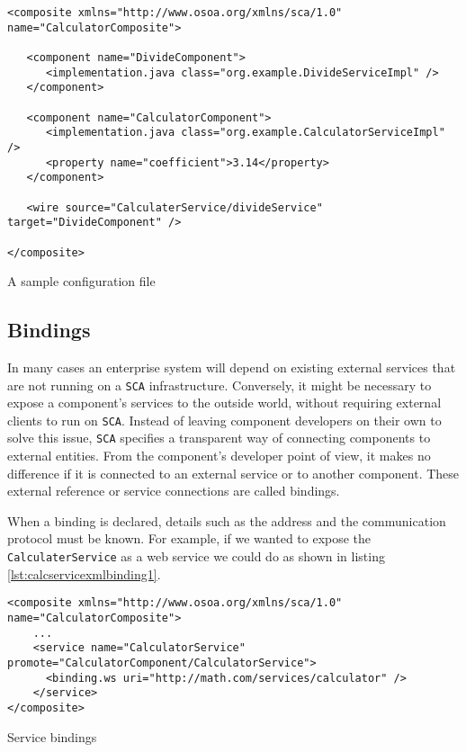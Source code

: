 \begin{listing}
\begin{verbatim}
<composite xmlns="http://www.osoa.org/xmlns/sca/1.0" name="CalculatorComposite">

   <component name="DivideComponent">
      <implementation.java class="org.example.DivideServiceImpl" />
   </component>

   <component name="CalculatorComponent">
      <implementation.java class="org.example.CalculatorServiceImpl" />
      <property name="coefficient">3.14</property>
   </component>
   
   <wire source="CalculaterService/divideService" target="DivideComponent" />

</composite>
\end{verbatim}
\caption{A sample configuration file}
\label{lst:calcservicexmlwires}
\end{listing}

\subsection{Bindings}

In many cases an enterprise system will depend on existing external services that are not running on a \texttt{SCA} infrastructure.
Conversely, it might be necessary to expose a component's services to the outside world, without requiring external clients
to run on \texttt{SCA}. Instead of leaving component developers on their own to solve this issue, \texttt{SCA} specifies
a transparent way of connecting components to external entities. From the component's developer point of view, it makes
no difference if it is connected to an external service or to another component. These external reference or service
connections are called bindings.

When a binding is declared, details such as the address and the communication protocol must be known. For example, if we
wanted to expose the \texttt{CalculaterService} as a web service we could do as shown in listing \ref{lst:calcservicexmlbinding1}.

\begin{listing}
\begin{verbatim}
<composite xmlns="http://www.osoa.org/xmlns/sca/1.0" name="CalculatorComposite">
    ...
    <service name="CalculatorService" promote="CalculatorComponent/CalculatorService">
      <binding.ws uri="http://math.com/services/calculator" />
    </service>
</composite>
\end{verbatim}
\caption{Service bindings}
\label{lst:calcservicexmlbinding1}
\end{listing}

